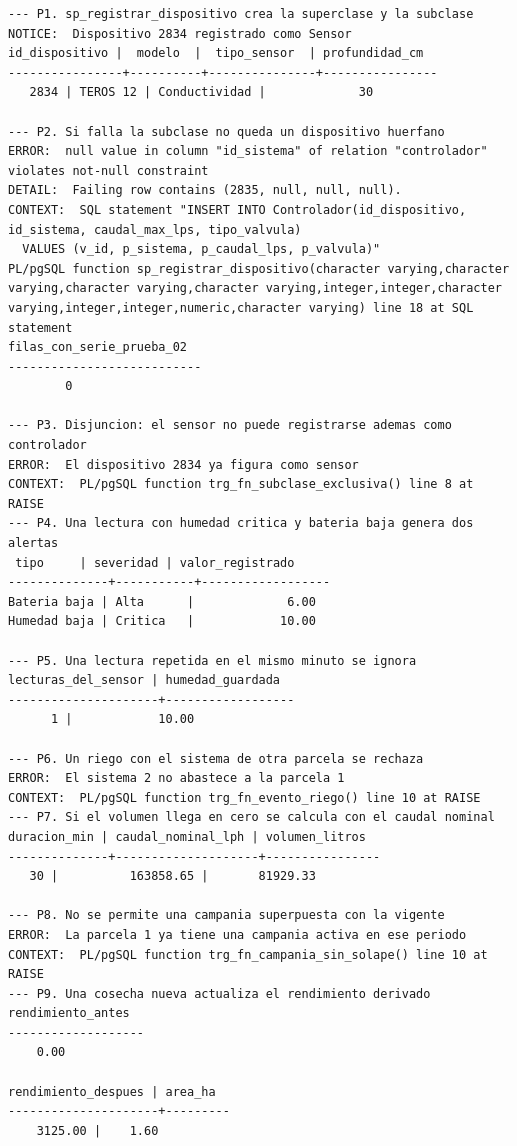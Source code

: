 \documentclass[11pt,letterpaper]{article}
\begin{document}
\begin{lstlisting}[style=plano]
--- P1. sp_registrar_dispositivo crea la superclase y la subclase
NOTICE:  Dispositivo 2834 registrado como Sensor
id_dispositivo |  modelo  |  tipo_sensor  | profundidad_cm 
----------------+----------+---------------+----------------
   2834 | TEROS 12 | Conductividad |             30

--- P2. Si falla la subclase no queda un dispositivo huerfano
ERROR:  null value in column "id_sistema" of relation "controlador" violates not-null constraint
DETAIL:  Failing row contains (2835, null, null, null).
CONTEXT:  SQL statement "INSERT INTO Controlador(id_dispositivo, id_sistema, caudal_max_lps, tipo_valvula)
  VALUES (v_id, p_sistema, p_caudal_lps, p_valvula)"
PL/pgSQL function sp_registrar_dispositivo(character varying,character varying,character varying,character varying,integer,integer,character varying,integer,integer,numeric,character varying) line 18 at SQL statement
filas_con_serie_prueba_02 
---------------------------
        0

--- P3. Disjuncion: el sensor no puede registrarse ademas como controlador
ERROR:  El dispositivo 2834 ya figura como sensor
CONTEXT:  PL/pgSQL function trg_fn_subclase_exclusiva() line 8 at RAISE
--- P4. Una lectura con humedad critica y bateria baja genera dos alertas
 tipo     | severidad | valor_registrado 
--------------+-----------+------------------
Bateria baja | Alta      |             6.00
Humedad baja | Critica   |            10.00

--- P5. Una lectura repetida en el mismo minuto se ignora
lecturas_del_sensor | humedad_guardada 
---------------------+------------------
      1 |            10.00

--- P6. Un riego con el sistema de otra parcela se rechaza
ERROR:  El sistema 2 no abastece a la parcela 1
CONTEXT:  PL/pgSQL function trg_fn_evento_riego() line 10 at RAISE
--- P7. Si el volumen llega en cero se calcula con el caudal nominal
duracion_min | caudal_nominal_lph | volumen_litros 
--------------+--------------------+----------------
   30 |          163858.65 |       81929.33

--- P8. No se permite una campania superpuesta con la vigente
ERROR:  La parcela 1 ya tiene una campania activa en ese periodo
CONTEXT:  PL/pgSQL function trg_fn_campania_sin_solape() line 10 at RAISE
--- P9. Una cosecha nueva actualiza el rendimiento derivado
rendimiento_antes 
-------------------
    0.00

rendimiento_despues | area_ha 
---------------------+---------
    3125.00 |    1.60


\end{lstlisting}
\end{document}
